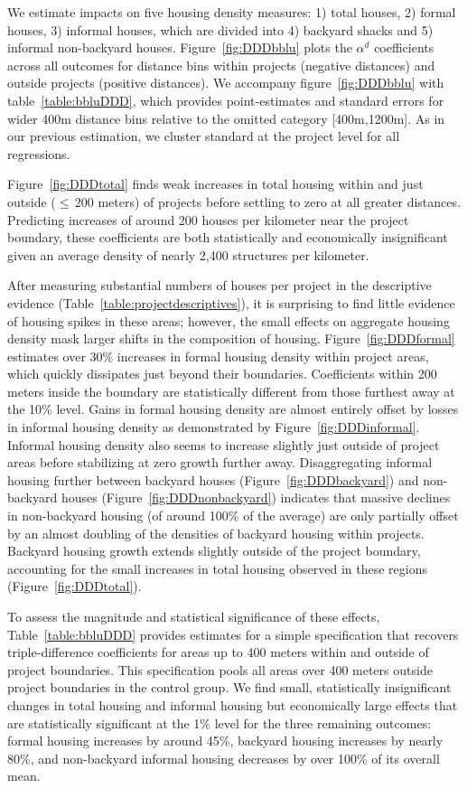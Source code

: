\documentclass[12pt]{article}
\begin{document}
We estimate impacts on five housing density measures: 1) total houses, 2) formal houses, 3) informal houses, which are divided into 4) backyard shacks and 5) informal non-backyard houses.  Figure~\ref{fig:DDDbblu} plots the $\alpha^{d}$ coefficients across all outcomes for distance bins within projects (negative distances) and outside projects (positive distances). We accompany figure~\ref{fig:DDDbblu} with table~\ref{table:bbluDDD}, which provides point-estimates and standard errors for wider 400m distance bins relative to the omitted category [400m,1200m]. As in our previous estimation, we cluster standard at the project level for all regressions.


Figure~\ref{fig:DDDtotal} finds weak increases in total housing within and just outside ($\leq\,$200 meters) of projects before settling to zero at all greater distances.  Predicting increases of around 200 houses per kilometer near the project boundary, these coefficients are both statistically and economically insignificant given an average density of nearly 2,400 structures per kilometer.  

After measuring substantial numbers of houses per project in the descriptive evidence (Table~\ref{table:projectdescriptives}), it is surprising to find little evidence of housing spikes in these areas; however, the small effects on aggregate housing density mask larger shifts in the composition of housing.  Figure~\ref{fig:DDDformal} estimates over 30\% increases in formal housing density within project areas, which quickly dissipates just beyond their boundaries.  Coefficients within 200 meters inside the boundary are statistically different from those furthest away at the 10\% level.  Gains in formal housing density are almost entirely offset by losses in informal housing density as demonstrated by Figure~\ref{fig:DDDinformal}.  Informal housing density also seems to increase slightly just outside of project areas before stabilizing at zero growth further away.  Disaggregating informal housing further between backyard houses (Figure~\ref{fig:DDDbackyard}) and non-backyard houses (Figure~\ref{fig:DDDnonbackyard}) indicates that massive declines in non-backyard housing (of around 100\% of the average) are only partially offset by an almost doubling of the densities of backyard housing within projects.  Backyard housing growth extends slightly outside of the project boundary, accounting for the small increases in total housing observed in these regions (Figure~\ref{fig:DDDtotal}).

To assess the magnitude and statistical significance of these effects, Table~\ref{table:bbluDDD} provides estimates for a simple specification that recovers triple-difference coefficients for areas up to 400 meters within and outside of project boundaries.  This specification pools all areas over 400 meters outside project boundaries in the control group.  We find small, statistically insignificant changes in total housing and informal housing but economically large effects that are statistically significant at the 1\% level for the three remaining outcomes: formal housing increases by around 45\%, backyard housing increases by nearly 80\%, and non-backyard informal housing decreases by over 100\% of its overall mean.  
\end{document}
